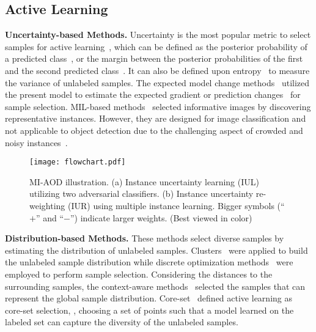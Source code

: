 \documentclass[final]{cvpr}
\begin{document}
\subsection{Active Learning}


\textbf{Uncertainty-based Methods.} Uncertainty is the most popular metric to select samples for active learning~\cite{Survey12}, which can be defined as the posterior probability of a predicted class~\cite{TextClassifier94, Heterogeneous94}, or the margin between the posterior probabilities of the first and the second predicted class~\cite{MultiClass09, MarginBased06}. It can also be defined upon entropy~\cite{SequenceLabel08, LatentStruct13, MultiClass09} to measure the variance of unlabeled samples. 
The expected model change methods~\cite{ErrorReduction01,MultiInstance07} utilized the present model to estimate the expected gradient or prediction changes~\cite{SelectInfluent14, ActiveContinuous16} for sample selection. MIL-based methods~\cite{MultiInstance07, MultiInstanceLabel17, IncorpDiver17, BagLevelAggre19} selected informative images by discovering representative instances. However, they are designed for image classification and not applicable to object detection due to the challenging aspect of crowded and noisy instances~\cite{MinEntropy2019,CMIL2019}.

\begin{figure*}[t]
    \centering
    \texttt{[image: flowchart.pdf]}
    \caption{MI-AOD illustration. (a) Instance uncertainty learning (IUL) utilizing two adversarial classifiers. (b) Instance uncertainty re-weighting (IUR) using multiple instance learning. Bigger symbols (``$+$'' and ``$-$'') indicate larger weights. (Best viewed in color)}
    \label{fig:illustration}
\end{figure*}

\textbf{Distribution-based Methods.} These methods select diverse samples by estimating the distribution of unlabeled samples. Clusters~\cite{PreCluster04} were applied to build the unlabeled sample distribution while discrete optimization methods~\cite{MatrixPartition10,ConvexOptim13,MultiClassUncerDiver15} were employed to perform sample selection. Considering the distances to the surrounding samples, the context-aware methods~\cite{ContextAware15, HierarchicalSubquery14} selected the samples that can represent the global sample distribution. Core-set~\cite{CoreSet18} defined active learning as core-set selection, \ie, choosing a set of points such that a model learned on the labeled set can capture the diversity of the unlabeled samples. 
\end{document}
